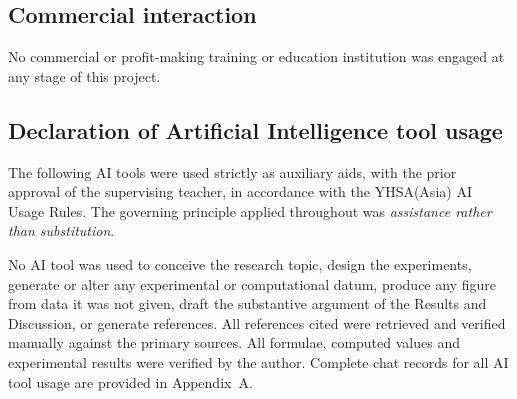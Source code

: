\subsection*{Commercial interaction}
No commercial or profit-making training or education institution was engaged at any stage of this
project.

\subsection*{Declaration of Artificial Intelligence tool usage}
The following AI tools were used strictly as auxiliary aids, with the prior approval of the
supervising teacher, in accordance with the YHSA(Asia) AI Usage Rules. The governing principle
applied throughout was \emph{assistance rather than substitution}.


No AI tool was used to conceive the research topic, design the experiments, generate or alter any
experimental or computational datum, produce any figure from data it was not given, draft the
substantive argument of the Results and Discussion, or generate references. All references cited
were retrieved and verified manually against the primary sources. All formulae, computed values and
experimental results were verified by the author. Complete chat records for all AI tool usage are
provided in Appendix~A.

\clearpage
